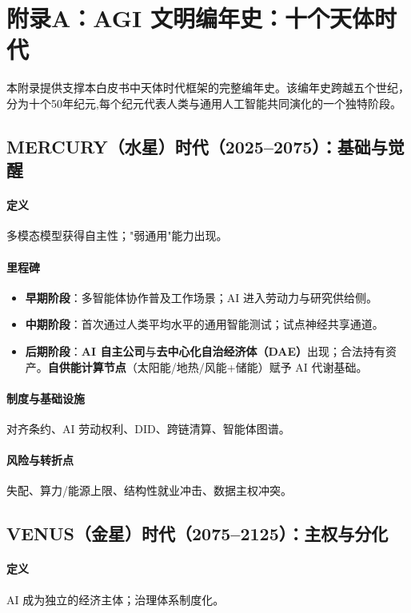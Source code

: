 \documentclass[11pt]{article}
\begin{document}
\appendix
\newpage

\section{附录A：AGI 文明编年史：十个天体时代}
\label{appendix:chronicle}

本附录提供支撑本白皮书中天体时代框架的完整编年史。该编年史跨越五个世纪，分为十个50年纪元,每个纪元代表人类与通用人工智能共同演化的一个独特阶段。

\subsection{MERCURY（水星）时代（2025–2075）：基础与觉醒}
\paragraph{定义} 多模态模型获得自主性；"弱通用"能力出现。

\paragraph{里程碑}
\begin{itemize}[noitemsep]
  \item \textbf{早期阶段}：多智能体协作普及工作场景；AI 进入劳动力与研究供给侧。
  \item \textbf{中期阶段}：首次通过人类平均水平的通用智能测试；试点神经共享通道。
  \item \textbf{后期阶段}：\textbf{AI 自主公司}与\textbf{去中心化自治经济体（DAE）}出现；合法持有资产。\textbf{自供能计算节点}（太阳能/地热/风能+储能）赋予 AI 代谢基础。
\end{itemize}

\paragraph{制度与基础设施} 对齐条约、AI 劳动权利、DID、跨链清算、智能体图谱。

\paragraph{风险与转折点} 失配、算力/能源上限、结构性就业冲击、数据主权冲突。

\subsection{VENUS（金星）时代（2075–2125）：主权与分化}
\paragraph{定义} AI 成为独立的经济主体；治理体系制度化。
\end{document}
